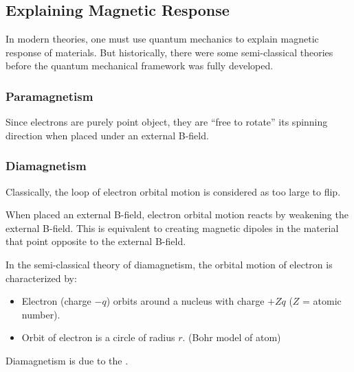 \documentclass[class=article, crop=false, 12pt]{standalone}
\begin{document}
\subsection{Explaining Magnetic Response}

In modern theories, one must use quantum mechanics to explain magnetic response of materials.
But historically, there were some semi-classical theories before the quantum mechanical framework was fully developed. 


\subsubsection{Paramagnetism}

Since electrons are purely point object, 
they are ``free to rotate'' its spinning direction when placed under an external B-field.

\subsubsection{Diamagnetism}

Classically, the loop of electron orbital motion is considered as too large to flip. 


When placed an external B-field, 
electron orbital motion reacts by weakening the external B-field.
This is equivalent to creating magnetic dipoles in the material that point opposite to the external B-field.


In the semi-classical theory of diamagnetism, 
the orbital motion of electron is characterized by:
\begin{itemize}
    \item Electron (charge $-q$) orbits around a nucleus with charge $+Zq$ 
    ($Z$ = atomic number).

    \item Orbit of electron is a circle of  radius $r$. 
    (Bohr model of atom)

\end{itemize}

Diamagnetism is due to the .
\end{document}
